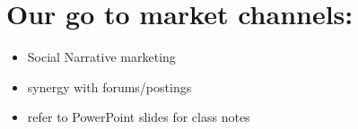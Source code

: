 \section{Our go to market channels:}
\begin{itemize}
    \item Social Narrative marketing
    \item synergy with forums/postings 
    \item refer to PowerPoint slides for class notes
\end{itemize}